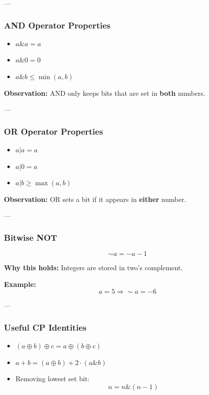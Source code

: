 \documentclass[11pt]{article}
\begin{document}
---

\subsubsection{AND Operator Properties}

\begin{itemize}
    \item $a \& a = a$
    \item $a \& 0 = 0$
    \item $a \& b \le \min(a, b)$
\end{itemize}

\textbf{Observation:}  
AND only keeps bits that are set in \textbf{both} numbers.

---

\subsubsection{OR Operator Properties}

\begin{itemize}
    \item $a | a = a$
    \item $a | 0 = a$
    \item $a | b \ge \max(a, b)$
\end{itemize}

\textbf{Observation:}  
OR sets a bit if it appears in \textbf{either} number.

---

\subsubsection{Bitwise NOT}

\[
\sim a = -a - 1
\]

\textbf{Why this holds:}  
Integers are stored in two's complement.

\textbf{Example:}
\[
a = 5 \Rightarrow \sim a = -6
\]

---

\subsubsection{Useful CP Identities}

\begin{itemize}
    \item $(a \oplus b) \oplus c = a \oplus (b \oplus c)$
    \item $a + b = (a \oplus b) + 2 \cdot (a \& b)$
    \item Removing lowest set bit:
    \[
    n = n \& (n-1)
    \]
\end{itemize}
\end{document}
